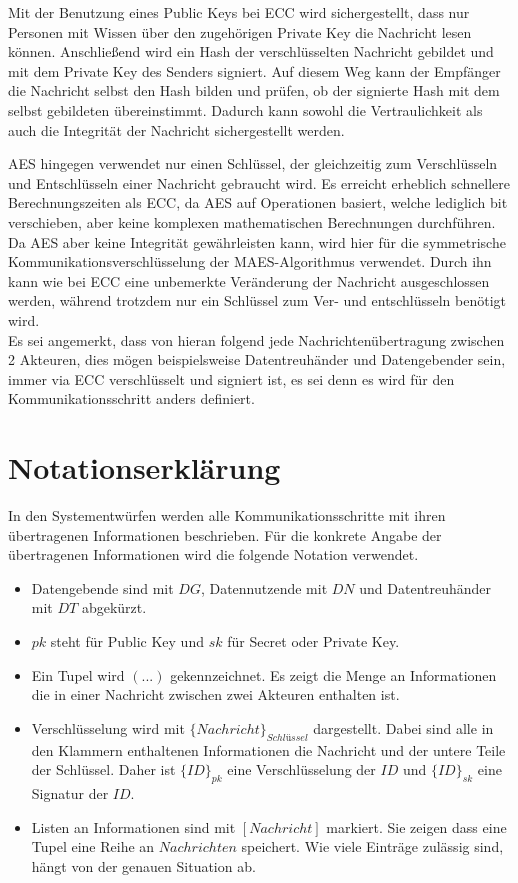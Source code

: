 \documentclass{scrreprt}
\begin{document}
Mit der Benutzung eines Public Keys bei ECC wird sichergestellt, dass nur Personen mit Wissen über den zugehörigen Private Key die Nachricht lesen können. Anschließend wird ein Hash der verschlüsselten Nachricht gebildet und mit dem Private Key des Senders signiert. Auf diesem Weg kann der Empfänger die Nachricht selbst den Hash bilden und prüfen, ob der signierte Hash mit dem selbst gebildeten übereinstimmt. Dadurch kann sowohl die Vertraulichkeit als auch die Integrität der Nachricht sichergestellt werden.

AES hingegen verwendet nur einen Schlüssel, der gleichzeitig zum Verschlüsseln und Entschlüsseln einer Nachricht gebraucht wird. Es erreicht erheblich schnellere Berechnungszeiten als ECC, da AES auf Operationen basiert, welche lediglich bit verschieben, aber keine komplexen mathematischen Berechnungen durchführen. Da AES aber keine Integrität gewährleisten kann, wird hier für die symmetrische Kommunikationsverschlüsselung der MAES-Algorithmus verwendet. Durch ihn kann wie bei ECC eine unbemerkte Veränderung der Nachricht ausgeschlossen werden, während trotzdem nur ein Schlüssel zum Ver- und entschlüsseln benötigt wird.\\

Es sei angemerkt, dass von hieran folgend jede Nachrichtenübertragung zwischen 2 Akteuren, dies mögen beispielsweise Datentreuhänder und Datengebender sein, immer via ECC verschlüsselt und signiert ist, es sei denn es wird für den Kommunikationsschritt anders definiert.

\section{Notationserklärung}
In den Systementwürfen werden alle Kommunikationsschritte mit ihren übertragenen Informationen beschrieben. Für die konkrete Angabe der übertragenen Informationen wird die folgende Notation verwendet.
\begin{itemize}
    \item Datengebende sind mit $DG$, Datennutzende mit $DN$ und Datentreuhänder mit $DT$ abgekürzt.
    \item $pk$ steht für Public Key und $sk$ für Secret oder Private Key.
    \item Ein Tupel wird $(...)$ gekennzeichnet. Es zeigt die Menge an Informationen die in einer Nachricht zwischen zwei Akteuren enthalten ist.
    \item Verschlüsselung wird mit ${\{Nachricht\}}_{Schl\textit{ü}ssel}$ dargestellt. Dabei sind alle in den Klammern enthaltenen Informationen die Nachricht und der untere Teile der Schlüssel. Daher ist ${\{ID\}}_{pk}$ eine Verschlüsselung der $ID$ und ${\{ID\}}_{sk}$ eine Signatur der $ID$.
    \item Listen an Informationen sind mit $[Nachricht]$ markiert. Sie zeigen dass eine Tupel eine Reihe an $Nachrichten$ speichert. Wie viele Einträge zulässig sind, hängt von der genauen Situation ab.
\end{itemize}
\end{document}
